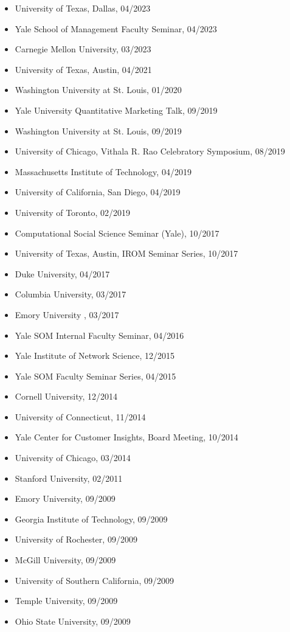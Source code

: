 \documentclass[margin, line, centered, 10pt]{res}
\begin{document}
\begin{resume}
\begin{itemize}
\item University of Texas, Dallas, 04/2023
\item Yale School of Management Faculty Seminar, 04/2023
\item Carnegie Mellon University, 03/2023
\item University of Texas, Austin, 04/2021
\item Washington University at St. Louis, 01/2020
\item Yale University Quantitative Marketing Talk, 09/2019
\item Washington University at St. Louis, 09/2019
\item University of Chicago, Vithala R. Rao Celebratory Symposium, 08/2019
\item Massachusetts Institute of Technology, 04/2019
\item University of California, San Diego, 04/2019
\item University of Toronto, 02/2019
\item Computational Social Science Seminar (Yale), 10/2017
\item University of Texas, Austin, IROM Seminar Series, 10/2017
\item Duke University, 04/2017
\item Columbia University, 03/2017
\item Emory University , 03/2017
\item Yale SOM Internal Faculty Seminar, 04/2016
\item Yale Institute of Network Science, 12/2015
\item Yale SOM Faculty Seminar Series, 04/2015
\item Cornell University, 12/2014
\item University of Connecticut, 11/2014
\item Yale Center for Customer Insights, Board Meeting, 10/2014
\item University of Chicago, 03/2014
\item Stanford University, 02/2011
\item Emory University, 09/2009
\item Georgia Institute of Technology, 09/2009
\item University of Rochester, 09/2009
\item McGill University, 09/2009
\item University of Southern California, 09/2009
\item Temple University, 09/2009
\item Ohio State University, 09/2009

\end{itemize}
\end{resume}
\end{document}

